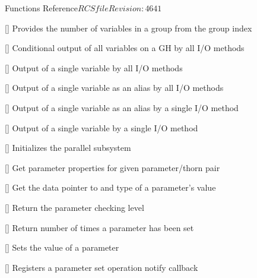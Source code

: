 \begin{cactuspart}{ Functions Reference}{$RCSfile$}{$Revision: 4641 $}
\begin{Lentry}
\item[\code{CCTK\_NumVarsInGroupI}] [\pageref{CCTK-NumVarsInGroupI}]
  Provides the number of variables in a group from the group index

\item[\code{CCTK\_OutputGH}] [\pageref{CCTK-OutputGH}]
  Conditional output of all variables on a GH by all I/O methods

\item[\code{CCTK\_OutputVar}] [\pageref{CCTK-OutputVar}]
  Output of a single variable by all I/O methods

\item[\code{CCTK\_OutputVarAs}] [\pageref{CCTK-OutputVarAs}]
  Output of a single variable as an alias by all I/O methods

\item[\code{CCTK\_OutputVarAsByMethod}] [\pageref{CCTK-OutputVarAsByMethod}]
  Output of a single variable as an alias by a single I/O method

\item[\code{CCTK\_OutputVarByMethod}] [\pageref{CCTK-OutputVarByMethod}]
  Output of a single variable by a single I/O method

\item[\code{CCTK\_ParallelInit}] [\pageref{CCTK-ParallelInit}]
  Initializes the parallel subsystem

\item[\code{CCTK\_ParameterData}]
  [\pageref{CCTK-ParameterData}]
  Get parameter properties for given parameter/thorn pair

\item[\code{CCTK\_ParameterGet}]
  [\pageref{CCTK-ParameterGet}]
  Get the data pointer to and type of a parameter's value

\item[\code{CCTK\_ParameterLevel}]
  [\pageref{CCTK-ParameterLevel}]
  Return the parameter checking level

\item[\code{CCTK\_ParameterQueryTimesSet}]
  [\pageref{CCTK-ParameterQueryTimesSet}]
  Return number of times a parameter has been set

\item[\code{CCTK\_ParameterSet}]
  [\pageref{CCTK-ParameterSet}]
  Sets the value of a parameter

\item[\code{CCTK\_ParameterSetNotifyRegister}]
  [\pageref{CCTK-ParameterSetNotifyRegister}]
  Registers a parameter set operation notify callback


\end{Lentry}
\end{cactuspart}
